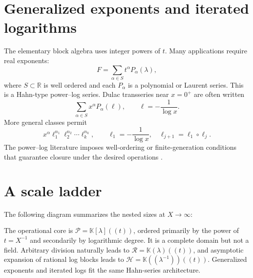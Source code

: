 \documentclass[11pt,openany]{book}
\theoremstyle{definition}
\theoremstyle{plain}
\theoremstyle{remark}
\newcommand{\R}{\mathbb{R}}
\newcommand{\K}{\mathbb{K}}
\newcommand{\Plog}{\mathscr{P}}
\newcommand{\Rlog}{\mathscr{R}}
\newcommand{\Hlog}{\mathscr{H}}
\newcommand{\succdom}{\succ}
\begin{document}
\section{Generalized exponents and iterated logarithms}
The elementary block algebra uses integer powers of \(t\). Many applications require real exponents:
\begin{equation}\label{eq:general-powerlog}
 F=\sum_{\alpha\in S}t^\alpha P_\alpha(\lambda),
\end{equation}
where \(S\subset\R\) is well ordered and each \(P_\alpha\) is a polynomial or Laurent series. This is a Hahn-type power--log series. Dulac transseries near \(x=0^+\) are often written
\[
 \sum_{\alpha\in S}x^\alpha P_\alpha(\ell),
 \qquad \ell=-\frac1{\log x}.
\]
More general classes permit
\[
 x^\alpha\ell_1^{n_1}\ell_2^{n_2}\cdots\ell_k^{n_k},
 \qquad
 \ell_1=-\frac1{\log x},\quad
 \ell_{j+1}=\ell_1\circ\ell_j.
\]
The power--log literature imposes well-ordering or finite-generation conditions that guarantee closure under the desired operations \cite{mardesic-normalforms,mardesic-length,resman-dulac,peran-logtransseries}.

\section{A scale ladder}
The following diagram summarizes the nested sizes at \(X\to\infty\):
\begin{center}
\end{center}

\begin{summarybox}
The operational core is \(\Plog=\K[\lambda]((t))\), ordered primarily by the power of \(t=X^{-1}\) and secondarily by logarithmic degree. It is a complete domain but not a field. Arbitrary division naturally leads to \(\Rlog=\K(\lambda)((t))\), and asymptotic expansion of rational log blocks leads to \(\Hlog=\K((\lambda^{-1}))((t))\). Generalized exponents and iterated logs fit the same Hahn-series architecture.
\end{summarybox}
\end{document}
